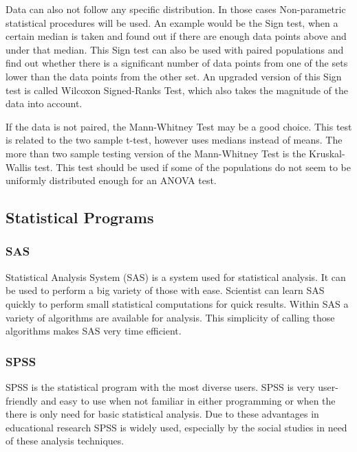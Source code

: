 \documentclass[10pt,a4paper]{report}
\begin{document}
	Data can also not follow any specific distribution. In those cases 
	Non-parametric statistical procedures will be used. An example would be the 
	Sign test, when a certain median is taken and found out if there are enough 
	data points above and under that median. This Sign test can also be used 
	with paired populations and find out whether there is a significant number 
	of data points from one of the sets lower than the data points from the 
	other set. An upgraded version of this Sign test is called Wilcoxon 
	Signed-Ranks Test, which also takes the magnitude of the data into 
	account.\cite{heiberger2004statistical}
	
	If the data is not paired, the Mann-Whitney Test may be a good choice. This	
	test is related to the two sample t-test, however uses medians instead of 
	means. The more than two sample testing version of the Mann-Whitney Test is 
	the Kruskal-Wallis test. This test should be used if some of the 
	populations do not seem to be uniformly distributed enough for an ANOVA 
	test.\cite{heiberger2004statistical}
	
	\clearpage
	
	\subsection{Statistical Programs}
	
	\subsubsection{SAS}
	
	Statistical Analysis System (SAS) is a system used for statistical 
	analysis. It can be used to perform a big variety of those with ease. 
	Scientist can learn SAS quickly to perform small statistical computations 
	for quick results. Within SAS a variety of algorithms are available for 
	analysis. This simplicity of calling those algorithms makes SAS very time 
	efficient. \cite{o2013step}
	
	\subsubsection{SPSS}
	
	SPSS is the statistical program with the most diverse users. SPSS is very 
	user-friendly and easy to use when not familiar in either programming or 
	when the there is only need for basic statistical analysis. Due to these 
	advantages in educational research SPSS is widely used, especially by the 
	social studies in need of these analysis techniques. \cite{muijs2010doing}
	
\end{document}
